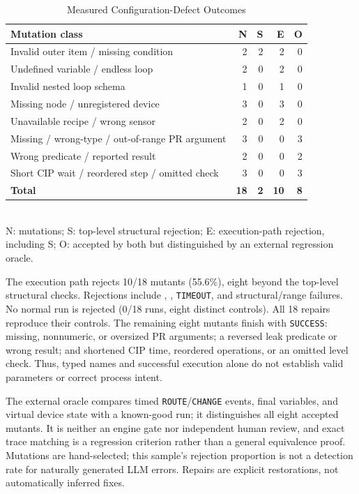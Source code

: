 \documentclass[conference]{IEEEtran}
\begin{document}
\begin{table}[t]
\caption{Measured Configuration-Defect Outcomes}
\label{tab:errors}
\centering
\small
\setlength{\tabcolsep}{4pt}
\begin{tabular}{|P{4.45cm}|r|r|r|r|}
\hline
\textbf{Mutation class} & \textbf{N} & \textbf{S} & \textbf{E} & \textbf{O}\\
\hline
Invalid outer item / missing condition & 2 & 2 & 2 & 0\\
\hline
Undefined variable / endless loop & 2 & 0 & 2 & 0\\
\hline
Invalid nested loop schema & 1 & 0 & 1 & 0\\
\hline
Missing node / unregistered device & 3 & 0 & 3 & 0\\
\hline
Unavailable recipe / wrong sensor & 2 & 0 & 2 & 0\\
\hline
Missing / wrong-type / out-of-range PR argument & 3 & 0 & 0 & 3\\
\hline
Wrong predicate / reported result & 2 & 0 & 0 & 2\\
\hline
Short CIP wait / reordered step / omitted check & 3 & 0 & 0 & 3\\
\hline
\textbf{Total} & \textbf{18} & \textbf{2} & \textbf{10} & \textbf{8}\\
\hline
\end{tabular}
\\[2pt]
{\footnotesize N: mutations; S: top-level structural rejection; E: execution-path rejection, including S; O: accepted by both but distinguished by an external regression oracle.}
\end{table}

The execution path rejects 10/18 mutants (55.6\%), eight beyond the top-level structural checks. Rejections include , , \texttt{TIMEOUT}, and structural/range failures. No normal run is rejected (0/18 runs, eight distinct controls). All 18 repairs reproduce their controls. The remaining eight mutants finish with \texttt{SUCCESS}: missing, nonnumeric, or oversized PR arguments; a reversed leak predicate or wrong result; and shortened CIP time, reordered operations, or an omitted level check. Thus, typed names and successful execution alone do not establish valid parameters or correct process intent.

The external oracle compares timed \texttt{ROUTE}/\texttt{CHANGE} events, final variables, and virtual device state with a known-good run; it distinguishes all eight accepted mutants. It is neither an engine gate nor independent human review, and exact trace matching is a regression criterion rather than a general equivalence proof. Mutations are hand-selected; this sample's rejection proportion is not a detection rate for naturally generated LLM errors. Repairs are explicit restorations, not automatically inferred fixes.
\end{document}
